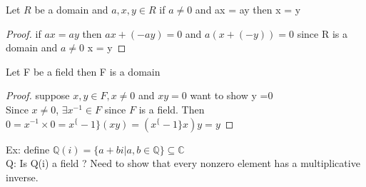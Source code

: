\documentclass{article}
\begin{document}
\begin{proposition}[3.1.3]
    Let $R$ be a domain and $a, x, y \in R$ if $a \not = 0$ and ax = ay then x  = y 
\end{proposition}
\begin{proof}
    if $ax = ay$ then $ax + (-ay) = 0 $ and $a(x + ( -y)) = 0$ since R is a domain and $a \not = 0$ x = y 
\end{proof}
\begin{proposition}[3.1.4]
    Let F be a field then F is a domain \begin{proof}
        suppose $x, y \in F, x \not = 0$ and $xy = 0$ want to show y =0 \\ 
        Since $x \not = 0$, $\exists x^{-1} \in F $ since $F$ is a field. Then $0 = x^{-1} \times 0 = x^\{-1\} (xy) = (x^\{-1\}x)y = y $

    \end{proof}
 \end{proposition}

 Ex: define $\mathbb{Q}(i) = \{a + bi | a, b \in \mathbb{Q} \} \subseteq \mathbb{C}$ 
 \\ 
 Q: Is Q(i) a field ? 
 Need to show that every nonzero element has a multiplicative inverse. 
\end{document}
